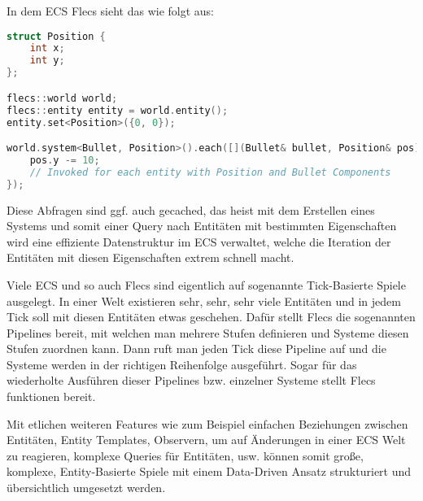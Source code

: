 \documentclass{article}
\begin{document}
    In dem ECS Flecs sieht das wie folgt aus:
    \begin{lstlisting}[language=C++]
struct Position {
    int x;
    int y;
};

flecs::world world;
flecs::entity entity = world.entity();
entity.set<Position>({0, 0});

world.system<Bullet, Position>().each([](Bullet& bullet, Position& pos) {
    pos.y -= 10;
    // Invoked for each entity with Position and Bullet Components
});
    \end{lstlisting}

    Diese Abfragen sind ggf. auch gecached, das heist mit dem Erstellen eines Systems und somit einer Query nach Entitäten
    mit bestimmten Eigenschaften wird eine effiziente Datenstruktur im ECS verwaltet, welche die Iteration der Entitäten
    mit diesen Eigenschaften extrem schnell macht.

    Viele ECS und so auch Flecs sind eigentlich auf sogenannte Tick-Basierte Spiele ausgelegt. In einer Welt existieren
    sehr, sehr, sehr viele Entitäten und in jedem Tick soll mit diesen Entitäten etwas geschehen. Dafür stellt Flecs die
    sogenannten Pipelines bereit, mit welchen man mehrere Stufen definieren und Systeme diesen Stufen zuordnen kann.
    Dann ruft man jeden Tick diese Pipeline auf und die Systeme werden in der richtigen Reihenfolge ausgeführt.
    Sogar für das wiederholte Ausführen dieser Pipelines bzw. einzelner Systeme stellt Flecs funktionen bereit.

    Mit etlichen weiteren Features wie zum Beispiel einfachen Beziehungen zwischen Entitäten, Entity Templates,
    Observern, um auf Änderungen in einer ECS Welt zu reagieren, komplexe Queries für Entitäten, usw. können somit
    große, komplexe, Entity-Basierte Spiele mit einem Data-Driven Ansatz strukturiert und übersichtlich umgesetzt werden.
    
\end{document}
